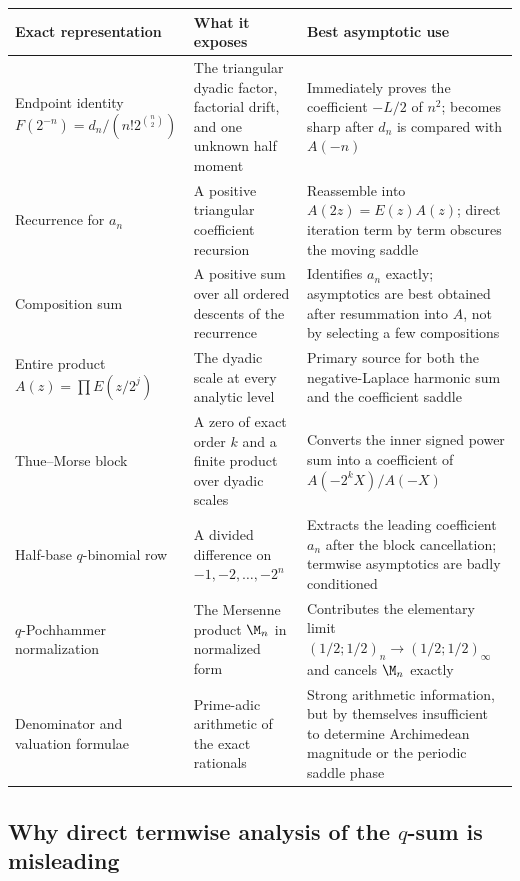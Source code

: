 \documentclass[11pt,oneside]{article}
\theoremstyle{definition}
\theoremstyle{remark}
\begin{document}
\begingroup\small
\begin{longtable}{@{}
  >{\raggedright\arraybackslash}p{}
  >{\raggedright\arraybackslash}p{}
  >{\raggedright\arraybackslash}p{}@{}}
\toprule
Exact representation & What it exposes & Best asymptotic use\\
\midrule
\endhead
Endpoint identity
$F(2^{-n})=d_n/(n!2^{\binom n2})$ &
The triangular dyadic factor, factorial drift, and one unknown half moment &
Immediately proves the coefficient $-L/2$ of $n^2$; becomes sharp after $d_n$ is compared
with $A(-n)$\\
\addlinespace
Recurrence for $a_n$ &
A positive triangular coefficient recursion &
Reassemble into $A(2z)=E(z)A(z)$; direct iteration term by term obscures the moving saddle\\
\addlinespace
Composition sum &
A positive sum over all ordered descents of the recurrence &
Identifies $a_n$ exactly; asymptotics are best obtained after resummation into $A$, not by
selecting a few compositions\\
\addlinespace
Entire product $A(z)=\prod E(z/2^j)$ &
The dyadic scale at every analytic level &
Primary source for both the negative-Laplace harmonic sum and the coefficient saddle\\
\addlinespace
Thue--Morse block &
A zero of exact order $k$ and a finite product over dyadic scales &
Converts the inner signed power sum into a coefficient of $A(-2^kX)/A(-X)$\\
\addlinespace
Half-base $q$-binomial row &
A divided difference on $-1,-2,\ldots,-2^n$ &
Extracts the leading coefficient $a_n$ after the block cancellation; termwise asymptotics
are badly conditioned\\
\addlinespace
$q$-Pochhammer normalization &
The Mersenne product $\M_n$ in normalized form &
Contributes the elementary limit
$(1/2;1/2)_n\to(1/2;1/2)_\infty$ and cancels $\M_n$ exactly\\
\addlinespace
Denominator and valuation formulae &
Prime-adic arithmetic of the exact rationals &
Strong arithmetic information, but by themselves insufficient to determine Archimedean
magnitude or the periodic saddle phase\\
\bottomrule
\end{longtable}
\endgroup

\subsection{Why direct termwise analysis of the \texorpdfstring{$q$}{q}-sum is misleading}
\end{document}

